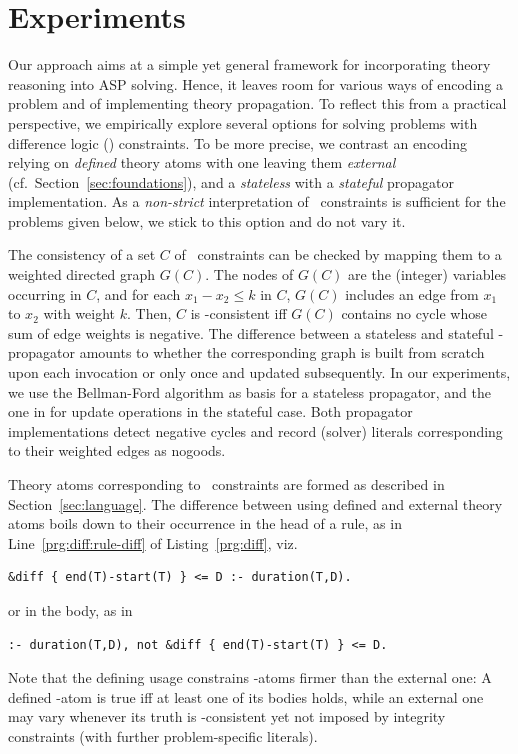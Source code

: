 
\section{Experiments}\label{sec:experiments}
\newcommand{\TO}{\multicolumn{1}{r|}{TO}}
\newcommand{\TI}{\multicolumn{1}{r|}{T}}

Our approach aims at a simple yet general framework for incorporating theory reasoning into ASP solving.
Hence, it leaves room for various ways of encoding a problem and of implementing theory propagation.
%
To reflect this from a practical perspective,
we empirically explore several options for solving problems with difference logic (\DL) constraints.
%
To be more precise,
we contrast an encoding relying on \emph{defined} theory atoms with one leaving them \emph{external} (cf.\ Section~\ref{sec:foundations}),
and a \emph{stateless} with a \emph{stateful} propagator implementation.
As a \emph{non-strict} interpretation of \DL\ constraints is sufficient
for the problems given below,
we stick to this option and do not vary it.

The consistency of a set $C$ of \DL\ constraints can be checked by mapping them to a weighted directed graph $G(C)$.
The nodes of $G(C)$ are the (integer) variables occurring in $C$,
and for each $x_1 - x_2 \leq k$ in $C$, $G(C)$ includes an edge from $x_1$ to $x_2$ with weight $k$.
Then, $C$ is \DL-consistent iff $G(C)$ contains no cycle whose sum of edge weights is negative.
%
The difference between a stateless and stateful \DL-propagator amounts to whether the corresponding graph is
built from scratch upon each invocation or only once and updated subsequently.
%
In our experiments,
we use the Bellman-Ford algorithm \cite{bellman58a,forful62a} as basis for a stateless propagator,
and the one in \cite{cotmal06a} for update operations in the stateful case.
%
Both propagator implementations detect negative cycles
and record (solver) literals corresponding to their weighted edges as nogoods.

Theory atoms corresponding to \DL\ constraints are formed as described in Section~\ref{sec:language}.
%
The difference between using defined and external theory atoms boils down to their occurrence in the head of a rule,
as in Line~\ref{prg:diff:rule-diff} of Listing~\ref{prg:diff}, viz.\
\begin{lstlisting}[morekeywords={&diff},alsoletter={\&},numbers=none]
&diff { end(T)-start(T) } <= D :- duration(T,D).
\end{lstlisting}
or in the body, as in
\begin{lstlisting}[morekeywords={&diff},alsoletter={\&},numbers=none]
:- duration(T,D), not &diff { end(T)-start(T) } <= D.
\end{lstlisting}
Note that the defining usage constrains \DL-atoms firmer than the external one:
A defined \DL-atom is true iff at least one of its bodies holds,
while an external one may vary whenever its truth is \DL-consistent yet
not imposed by integrity constraints (with further problem-specific literals).

